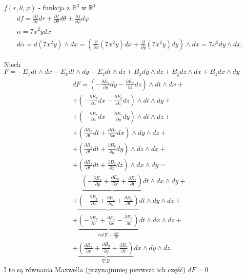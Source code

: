 \documentclass[../main.tex]{subfiles}
\begin{document}
    \begin{przyklad}
        $f(r,\theta,\varphi)$ - funkcja z $\mathbb{R}^3$ w $\mathbb{R}^1$.\\
        \begin{align*}
            &df = \frac{\partial f}{\partial r} dr + \frac{\partial f}{\partial \theta} d\theta + \frac{\partial f}{\partial \varphi} d\varphi\\
            &\alpha = 7x^2y dx\\
            &d\alpha = d(7x^2y)\land dx = \left( \frac{\partial }{\partial x} (7x^2y)dx + \frac{\partial }{\partial y} (7x^2y)dy \right) \land dx = 7x^2dy\land dx
        .\end{align*}
    \end{przyklad}
    \begin{przyklad}
        Niech $F = -E_xdt\land dx - E_xdt\land dy - E_z dt\land dz + B_xdy\land dz + B_y dz\land dx + B_zdx \land dy$
        \begin{align*}
            &dF = \left( -\frac{\partial E_x}{\partial y} dy - \frac{\partial E_x}{\partial z} dz \right) \land dt\land dx +\\
            &+ \left( - \frac{\partial E_y}{\partial x}dx - \frac{\partial E_y}{\partial z}dz  \right)\land dt \land dy + \\
            &+ \left( -\frac{\partial E_z}{\partial x} dx - \frac{\partial E_z}{\partial y} dy \right)\land dt \land dz + \\
            &+ \left( \frac{\partial B_x}{\partial t} dt + \frac{\partial B_x}{\partial x} dx \right) \land dy \land dz + \\
            &+ \left( \frac{\partial B_y}{\partial t} dt + \frac{\partial B_y}{\partial y} dy \right) \land dz \land dx + \\
            &+ \left( \frac{\partial B_z}{\partial t} dt + \frac{\partial B_z}{\partial z} dz \right) \land dx \land dy = \\
            &= \underbrace{\left( -\frac{\partial E_x}{\partial y} + \frac{\partial E_y}{\partial x} + \frac{\partial B_z}{\partial t}  \right)} dt\land dx\land dy + \\
            &+ \underbrace{\left( -\frac{\partial E_y}{\partial z} + \frac{\partial E_z}{\partial y} + \frac{\partial B_x}{\partial t}  \right)} dt\land dy\land dz + \\
            &+ \underbrace{\left( -\frac{\partial E_x}{\partial z} + \frac{\partial E_z}{\partial x} - \frac{\partial B_y}{\partial t}  \right)}_{rot E - \frac{\partial B}{\partial t} } dt\land dx\land dz + \\
            &+ \underbrace{\left( \frac{\partial B_x}{\partial x} + \frac{\partial B_y}{\partial y} + \frac{\partial B_z}{\partial z}  \right)}_{\nabla B} dx\land dy\land dz
        .\end{align*}
        I to są równania Maxwella (przynajmniej pierwsza ich część) $dF = 0$
    \end{przyklad}
\end{document}
